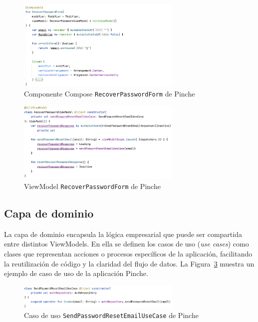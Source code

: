 \begin{figure}[H]
\centering
\includegraphics[width=0.7\textwidth]{./img/description/recoverPasswordView.png}
\caption{Componente Compose \texttt{RecoverPasswordForm} de Pinche}
\label{fig:recoverPasswordView}
\end{figure}

\begin{figure}[H]
\centering
\includegraphics[width=0.7\textwidth]{./img/description/recoverPasswordViewModel.png}
\caption{ViewModel \texttt{RecoverPasswordForm} de Pinche}
\label{fig:recoverPasswordViewModel}
\end{figure}

\subsection{Capa de dominio}

La capa de dominio encapsula la lógica empresarial que puede ser compartida entre distintos ViewModels. En ella se definen los casos de uso (\textit{use cases}) como clases que representan acciones o procesos específicos de la aplicación, facilitando la reutilización de código y la claridad del flujo de datos. La Figura~\ref{fig:recoverUseCase} muestra un ejemplo de caso de uso de la aplicación Pinche.

\begin{figure}[H]
\centering
\includegraphics[width=0.7\textwidth]{./img/description/recoverUseCase.png}
\caption{Caso de uso \texttt{SendPasswordResetEmailUseCase} de Pinche}
\label{fig:recoverUseCase}
\end{figure}

